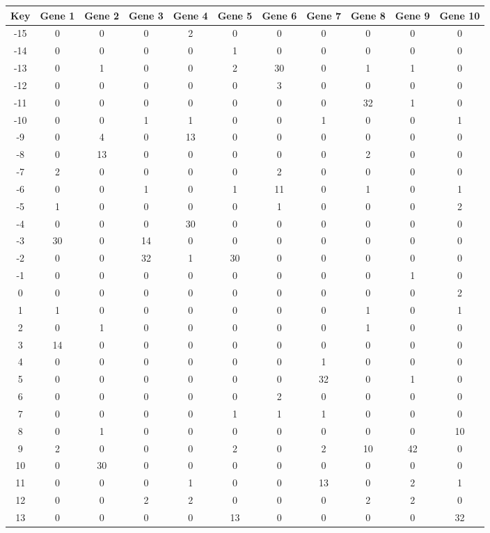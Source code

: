 \begin{tabular}{|c|c|c|c|c|c|c|c|c|c|c|}
\hline
Key & Gene 1 & Gene 2 & Gene 3 & Gene 4 & Gene 5 & Gene 6 & Gene 7 & Gene 8 & Gene 9 & Gene 10 \\
\hline
-15 & 0 & 0 & 0 & 2 & 0 & 0 & 0 & 0 & 0 & 0 \\
-14 & 0 & 0 & 0 & 0 & 1 & 0 & 0 & 0 & 0 & 0 \\
-13 & 0 & 1 & 0 & 0 & 2 & 30 & 0 & 1 & 1 & 0 \\
-12 & 0 & 0 & 0 & 0 & 0 & 3 & 0 & 0 & 0 & 0 \\
-11 & 0 & 0 & 0 & 0 & 0 & 0 & 0 & 32 & 1 & 0 \\
-10 & 0 & 0 & 1 & 1 & 0 & 0 & 1 & 0 & 0 & 1 \\
-9 & 0 & 4 & 0 & 13 & 0 & 0 & 0 & 0 & 0 & 0 \\
-8 & 0 & 13 & 0 & 0 & 0 & 0 & 0 & 2 & 0 & 0 \\
-7 & 2 & 0 & 0 & 0 & 0 & 2 & 0 & 0 & 0 & 0 \\
-6 & 0 & 0 & 1 & 0 & 1 & 11 & 0 & 1 & 0 & 1 \\
-5 & 1 & 0 & 0 & 0 & 0 & 1 & 0 & 0 & 0 & 2 \\
-4 & 0 & 0 & 0 & 30 & 0 & 0 & 0 & 0 & 0 & 0 \\
-3 & 30 & 0 & 14 & 0 & 0 & 0 & 0 & 0 & 0 & 0 \\
-2 & 0 & 0 & 32 & 1 & 30 & 0 & 0 & 0 & 0 & 0 \\
-1 & 0 & 0 & 0 & 0 & 0 & 0 & 0 & 0 & 1 & 0 \\
0 & 0 & 0 & 0 & 0 & 0 & 0 & 0 & 0 & 0 & 2 \\
1 & 1 & 0 & 0 & 0 & 0 & 0 & 0 & 1 & 0 & 1 \\
2 & 0 & 1 & 0 & 0 & 0 & 0 & 0 & 1 & 0 & 0 \\
3 & 14 & 0 & 0 & 0 & 0 & 0 & 0 & 0 & 0 & 0 \\
4 & 0 & 0 & 0 & 0 & 0 & 0 & 1 & 0 & 0 & 0 \\
5 & 0 & 0 & 0 & 0 & 0 & 0 & 32 & 0 & 1 & 0 \\
6 & 0 & 0 & 0 & 0 & 0 & 2 & 0 & 0 & 0 & 0 \\
7 & 0 & 0 & 0 & 0 & 1 & 1 & 1 & 0 & 0 & 0 \\
8 & 0 & 1 & 0 & 0 & 0 & 0 & 0 & 0 & 0 & 10 \\
9 & 2 & 0 & 0 & 0 & 2 & 0 & 2 & 10 & 42 & 0 \\
10 & 0 & 30 & 0 & 0 & 0 & 0 & 0 & 0 & 0 & 0 \\
11 & 0 & 0 & 0 & 1 & 0 & 0 & 13 & 0 & 2 & 1 \\
12 & 0 & 0 & 2 & 2 & 0 & 0 & 0 & 2 & 2 & 0 \\
13 & 0 & 0 & 0 & 0 & 13 & 0 & 0 & 0 & 0 & 32 \\
\hline
\end{tabular}